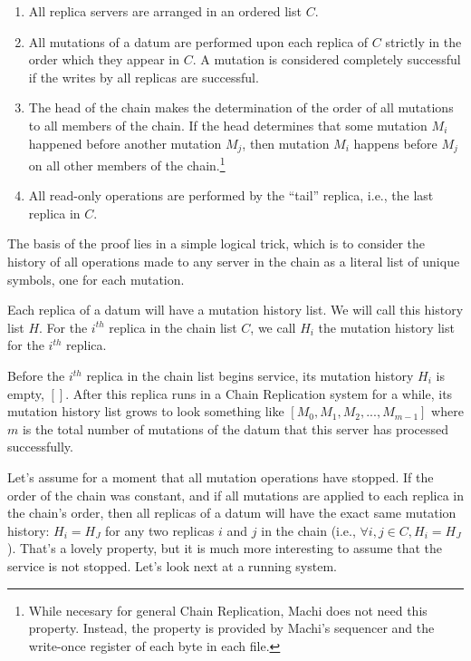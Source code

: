 \documentclass[preprint,10pt]{sigplanconf}
\begin{document}
\begin{enumerate}

\item All replica servers are arranged in an ordered list $C$.

\item All mutations of a datum are performed upon each replica of $C$
  strictly in the order which they appear in $C$.  A mutation is considered
  completely successful if the writes by all replicas are successful.

\item The head of the chain makes the determination of the order of
  all mutations to all members of the chain.  If the head determines
  that some mutation $M_i$ happened before another mutation $M_j$,
  then mutation $M_i$ happens before $M_j$ on all other members of
  the chain.\footnote{While necesary for general Chain Replication,
    Machi does not need this property.  Instead, the property is
    provided by Machi's sequencer and the write-once register of each
    byte in each file.}

\item All read-only operations are performed by the ``tail'' replica,
  i.e., the last replica in $C$.

\end{enumerate}

The basis of the proof lies in a simple logical trick, which is to
consider the history of all operations made to any server in the chain
as a literal list of unique symbols, one for each mutation.

Each replica of a datum will have a mutation history list.  We will
call this history list $H$. For the $i^{th}$ replica in the chain list
$C$, we call $H_i$ the mutation history list for the $i^{th}$ replica.

Before the $i^{th}$ replica in the chain list begins service, its mutation
history $H_i$ is empty, $[]$.  After this replica runs in a Chain
Replication system for a while, its mutation history list grows to
look something like 
$[M_0, M_1, M_2, ..., M_{m-1}]$ where $m$ is the total number of
mutations of the datum that this server has processed successfully.

Let's assume for a moment that all mutation operations have stopped.
If the order of the chain was constant, and if all mutations are
applied to each replica in the chain's order, then all replicas of a
datum will have the exact same mutation history: $H_i = H_J$ for any
two replicas $i$ and $j$ in the chain
(i.e., $\forall i,j \in C, H_i = H_J$).  That's a lovely property,
but it is much more interesting to assume that the service is
not stopped.  Let's look next at a running system.
\end{document}
